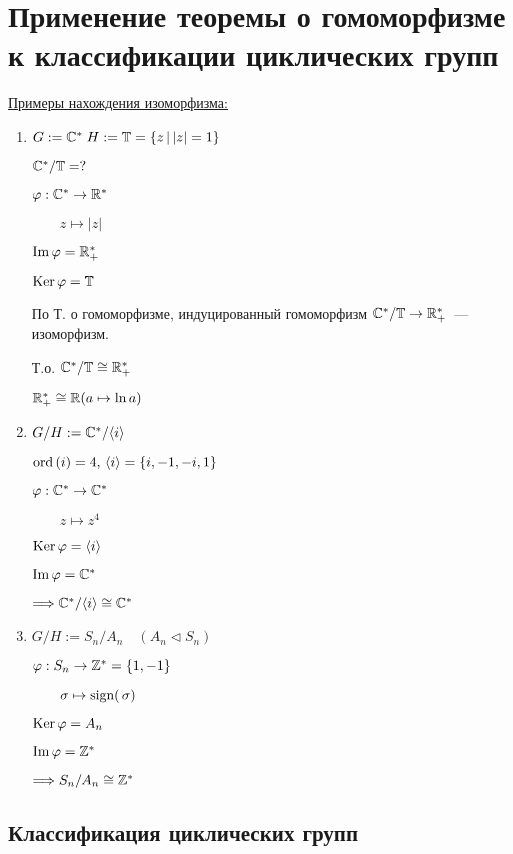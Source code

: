 \section{Применение теоремы о гомоморфизме к классификации циклических групп}
\underline{Примеры нахождения изоморфизма:}
\begin{enumerate}
    \item $G := \mathbb{C}^* \; H := \mathbb{T} = \{ z \, | \, |z| = 1 \}$
    
    $\mathbb{C}^* / \mathbb{T} = ?$ 

    $\varphi: \mathbb{C}^* \to \mathbb{R}^{*}$

    $\quad \quad z \mapsto |z|$

    $\operatorname{Im} \varphi = \mathbb{R}^{*}_{+}$

    $\operatorname{Ker} \varphi = \mathbb{T}$

    По Т. о гомоморфизме, индуцированный гомоморфизм $\mathbb{C}^{*} / \mathbb{T} \to \mathbb{R}^{*}_{+}$~--- изоморфизм.

    Т.о. $\mathbb{C}^* / \mathbb{T} \cong \mathbb{R}^{*}_+$

    \notice $\mathbb{R}^{*}_+ \cong \mathbb{R} (a \mapsto \ln{a})$

    \item $G / H := \mathbb{C}^* / \langle i \rangle$
    
    $\operatorname{ord}\left( i \right) = 4, \, \langle i \rangle = \{ i, -1, -i, 1 \}$
    
    $\varphi: \mathbb{C}^* \to \mathbb{C}^*$
    
    $\quad \quad z \mapsto z^4$

    $\operatorname{Ker} \varphi = \langle i \rangle$

    $\operatorname{Im} \varphi = \mathbb{C}^*$

    $\Longrightarrow \mathbb{C}^* / \langle i \rangle \cong \mathbb{C}^*$

    \item $G / H := S_n / A_n \quad (A_n \vartriangleleft S_n)$
    
    $\varphi: S_n \to \mathbb{Z}^* = \{ 1, -1 \}$

    $\quad \quad \sigma \mapsto \operatorname{sign (}\sigma)$

    $\operatorname{Ker} \varphi = A_n$

    $\operatorname{Im} \varphi = \mathbb{Z}^*$

    $\Longrightarrow S_n / A_n \cong \mathbb{Z}^{*}$
\end{enumerate}

\subsection*{Классификация циклических групп}


